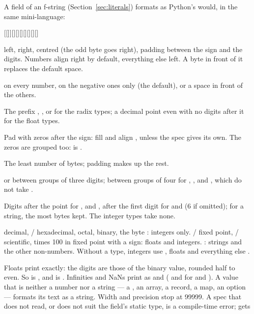 A field  of an f-string (Section~\ref{sec:literals})
formats  as Python's  would, in the same
mini-language:

\begin{center}
[[]][][\ic{\#}][][][][][]
\end{center}

\begin{description}[style=nextline,leftmargin=5.2em]
\item[\ty{align}] \ic{<} left, \ic{>} right, \ic{\textasciicircum{}}
  centred (the odd byte goes right), \ic{=} padding between the sign and
  the digits. Numbers align right by default, everything else left. A
   byte in front of it replaces the default space.
\item[\ty{sign}] \ic{+} on every number, \ic{-} on the negative ones only
  (the default), or a space in front of the others.
\item[\ic{\#}] The prefix , ,  or  for the
  radix types; a decimal point even with no digits after it for the
  float types.
\item[\ic{0}] Pad with zeros after the sign: fill  and align
  \ic{=}, unless the spec gives its own. The zeros are grouped too:
   is .
\item[\ty{width}] The least number of bytes; padding makes up the rest.
\item[\ty{grouping}] \ic{,} or \ic{\_} between groups of three digits;
  \ic{\_} between groups of four for , ,  and ,
  which do not take \ic{,}.
\item[\ty{precision}] Digits after the point for ,  and
  \ic{\%}, after the first digit for  and  (6 if omitted);
  for a string, the most bytes kept. The integer types take none.
\item[\ty{type}]  decimal, / hexadecimal,  octal,
   binary,  the byte : integers only. /
  fixed point, / scientific, \ic{\%} times 100 in fixed point
  with a \ic{\%} sign: floats and integers. : strings and the other
  non-numbers. Without a type, integers use , floats  and
  everything else .
\end{description}

\noindent Floats print exactly: the digits are those of the binary
value, rounded half to even. So  is , and
 is . Infinities and NaNs
print as  and  ( and  for  and
). A value that is neither a number nor a string --- a ,
an array, a record, a map, an option --- formats its  text
as a string. Width and precision stop at 99999. A spec that does not
read, or does not suit the field's static type, is a compile-time error;
 gets
\begin{center}
\end{center}

